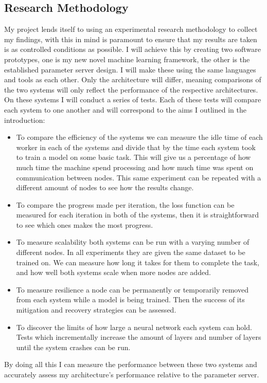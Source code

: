 \subsection{Research Methodology}
My project lends itself to using an experimental research methodology to collect
my findings, with this in mind is paramount to ensure that my results are taken
is as controlled conditions as possible. I will achieve this by
creating two software prototypes, one is my new novel machine learning
framework, the other is the established parameter server design. I will make
these using the same languages and tools as each other. Only the architecture
will differ, meaning comparisons of the two systems will only reflect the
performance of the respective architectures. On these systems I will conduct a
series of tests. Each of these tests will compare each system to one another and
will correspond to the aims I outlined in the introduction:
\begin{itemize}
    \item To compare the efficiency of the systems we can measure the idle time
    of each worker in each of the systems and divide that by the time each
    system took to train a model on some basic task. This will give us a
    percentage of how much time the machine spend processing and how much time
    was spent on communication between nodes. This same experiment can be
    repeated with a different amount of nodes to see how the results change.
    \item To compare the progress made per iteration, the loss function can be
    measured for each iteration in both of the systems, then it is
    straightforward to see which ones makes the most progress.
    \item To measure scalability both systems can be run with a varying number
    of different nodes. In all experiments they are given the same dataset to be
    trained on. We can measure how long it takes for them to complete the task,
    and how well both systems scale when more nodes are added.
    \item To measure resilience a node can be permanently or temporarily removed
    from each system while a model is being trained. Then the success of its
    mitigation and recovery strategies can be assessed.
    \item To discover the limits of how large a neural network each system can
    hold. Tests which incrementally increase the amount of layers and number of
    layers until the system crashes can be run.
\end{itemize}
By doing all this I can measure the performance between these two systems and
accurately assess my architecture's performance relative to the parameter server.

